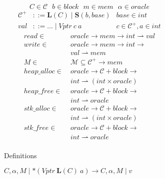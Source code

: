 \documentclass{article}
\begin{document}
\begin{figure}
  \begin{subfigure}{0.4\textwidth}
    \[C \in \mathcal{C}~~~ b \in \mathit{block}~~~  m \in \mathit{mem}~~~ \alpha \in \mathit{oracle}\]
    \[\begin{aligned}
    \mathcal{C}^+ & ::= \mathbf{L}(C) \mid \mathbf{S}(b, \mathit{base}) &
    \mathit{base} \in \mathit{int} \\
    \mathit{val} & ::= \ldots \mid \mathit{Vptr} ~ c ~ a &
    c \in \mathcal{C}^+, a \in \mathit{int}
    \end{aligned}\]
    \[\begin{split}
    \mathit{read} \in ~ & \mathit{oracle} \rightarrow \mathit{mem} \rightarrow
    \mathit{int} \rightharpoonup \mathit{val} \\
    \mathit{write} \in ~ & \mathit{oracle} \rightarrow \mathit{mem} \rightarrow
    \mathit{int} \rightarrow \\
    & \mathit{val} \rightharpoonup \mathit{mem} \\
    M \in ~ & \mathcal{M} \subseteq \mathcal{C}^+ \rightarrow \mathit{mem} \\
    \mathit{heap\_alloc} \in ~ & \mathit{oracle} \rightarrow
    \mathcal{C} + \mathit{block} \rightarrow \\
    & \mathit{int} \rightharpoonup (\mathit{int} \times \mathit{oracle}) \\
    \mathit{heap\_free} \in ~ & \mathit{oracle} \rightarrow \mathcal{C}+\mathit{block} \rightarrow \\
    & \mathit{int} \rightharpoonup \mathit{oracle} \\
    \mathit{stk\_alloc} \in ~ & \mathit{oracle} \rightarrow
    \mathcal{C} + \mathit{block} \rightarrow \\
    & \mathit{int} \rightharpoonup (\mathit{int} \times \mathit{oracle}) \\
    \mathit{stk\_free} \in ~ & \mathit{oracle} \rightarrow \mathcal{C}+\mathit{block} \rightarrow \\
    & \mathit{int} \rightharpoonup \mathit{oracle} \\
    \end{split}\]

    \caption{Definitions}
    \label{subfig:defs}
  \end{subfigure}
  \begin{subfigure}{0.59\textwidth}
             {\(C, \alpha, M \mid *(\mathit{Vptr} ~ \mathbf{L}(C) ~ a)
               \longrightarrow C, \alpha, M \mid v\)}


\end{subfigure}
\end{figure}
\end{document}
